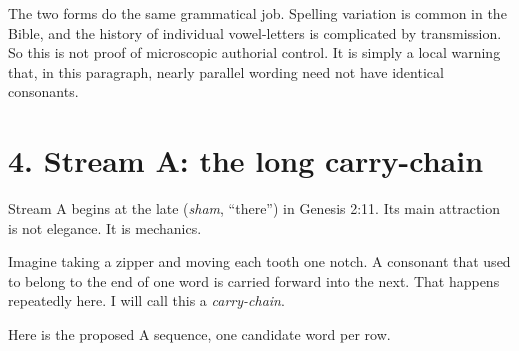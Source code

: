The two forms do the same grammatical job. Spelling variation is common in the Bible, and the history of individual vowel-letters is complicated by transmission.\cite{Elitzur2023,Hornkohl2024} So this is not proof of microscopic authorial control. It is simply a local warning that, in this paragraph, nearly parallel wording need not have identical consonants.

\section*{4. Stream A: the long carry-chain}

Stream A begins at the late  (\textit{sham}, ``there'') in Genesis 2:11. Its main attraction is not elegance. It is mechanics.

Imagine taking a zipper and moving each tooth one notch. A consonant that used to belong to the end of one word is carried forward into the next. That happens repeatedly here. I will call this a \emph{carry-chain}.

Here is the proposed A sequence, one candidate word per row.


